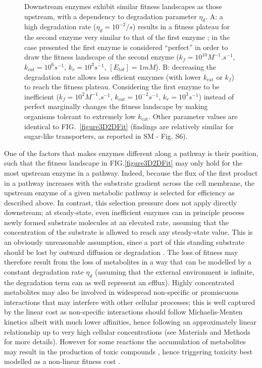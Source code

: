 \begin{figure}[t!]
\begin{minipage}[c]{0.48\linewidth}
\end{minipage}
\caption{Downstream enzymes exhibit similar fitness landscapes as those upstream, with a dependency to degradation parameter $\eta_d$. A: a high degradation rate ($\eta_d=10^{-2} /s$) results in a fitness plateau for the second enzyme very similar to that of the first enzyme ; in the case presented the first enzyme is considered ``perfect'' in order to draw the fitness landscape of the second enzyme ($k_f=10^{10}M^{-1}.s^{-1}$, $k_{cat}=10^6s^{-1}$, $k_r=10^3s^{-1}$, $[E_{tot}]=1mM$). B: decreasing the degradation rate allows less efficient enzymes (with lower $k_\text{cat}$ or $k_f$) to reach the fitness plateau. Considering the first enzyme to be inefficient ($k_f=10^{2}M^{-1}.s^{-1}$, $k_{cat}=10^{-2}s^{-1}$, $k_r=10^3s^{-1}$) instead of perfect marginally changes the fitness landscape by making organisms tolerant to extremely low $k_\text{cat}$. Other parameter values are identical to FIG.~\ref{figure3D2DFit} (findings are relatively similar for sugar-like transporters, as reported in SM - Fig. S6).}
\label{figure2D_2Enz_Deg}
\end{figure}

One of the factors that makes enzymes different along a pathway is their position, such that the fitness landscape in FIG.\ref{figure3D2DFit} may only hold for the most upstream enzyme in a pathway. Indeed, because the flux of the first product in a pathway increases with the substrate gradient across the cell membrane, the upstream enzyme of a given metabolic pathway is selected for efficiency as described above. In contrast, this selection pressure does not apply directly downstream; at steady-state, even inefficient enzymes can in principle process newly formed substrate molecules at an elevated rate, assuming that the concentration of the substrate is allowed to reach any steady-state value. This is an obviously unreasonable assumption, since a part of this standing substrate should be lost by outward diffusion or degradation \citep{Jones15,Bosdriesz18}. The loss of fitness may therefore result from the loss of metabolites in a way that can be modelled by a constant degradation rate $\eta_{d}$ \citep{Chou14} (assuming that the external environment is infinite, the degradation term can as well represent an efflux). Highly concentrated metabolites may also be involved in widespread non-specific \citep{Keller15} or promiscuous interactions \citep{Khersonsky10,Schauble13,Peracchi18} that may interfere with other cellular processes; this is well captured by the linear cost as non-specific interactions should follow Michaelis-Menten kinetics albeit with much lower affinities, hence following an approximately linear relationship up to very high cellular concentrations (see Materials and Methods for more details). However for some reactions the accumulation of metabolites may result in the production of toxic compounds \citep{Lilja17, Niehaus20}, hence triggering toxicity best modelled as a non-linear fitness cost \citep{Clark91,Wright10}.

